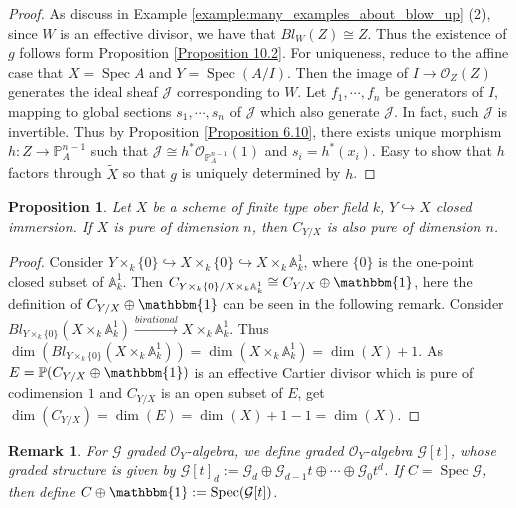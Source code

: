 \documentclass{ctexart}
\newtheorem{remark}{Remark}[section]
\newtheorem{proposition}{Proposition}[section]
\newcommand{\spec}{\operatorname{Spec}}
\begin{document}
\begin{proof}
    As discuss in Example \ref{example:many_examples_about_blow_up} (2), since $W$ is an effective divisor, we have that $Bl_{W}(Z) \cong Z$.
    Thus the existence of $g$ follows form Proposition \ref{Proposition 10.2}.
    For uniqueness, reduce to the affine case that $X = \spec A$ and $Y = \spec(A/I)$.
    Then the image of $I \longrightarrow \mathcal{O}_{Z}(Z)$ generates the ideal sheaf $\mathcal{J}$ corresponding to $W$.
    Let $f_{1}, \cdots, f_{n}$ be generators of $I$, mapping to global sections $s_{1}, \cdots, s_{n}$ of $\mathcal{J}$ which also generate $\mathcal{J}$.
    In fact, such $\mathcal{J}$ is invertible.
    Thus by Proposition \ref{Proposition 6.10}, there exists unique morphism $h: Z \longrightarrow \mathbb{P}_{A}^{n - 1}$ such that $\mathcal{J} \cong h^{\ast}\mathcal{O}_{\mathbb{P}_{A}^{n - 1}}(1)$ and $s_{i} = h^{\ast}(x_{i})$.
    Easy to show that $h$ factors through $\widetilde{X}$ so that $g$ is uniquely determined by $h$.
\end{proof}
\begin{proposition}
    Let $X$ be a scheme of finite type ober field $k$, $Y \hookrightarrow X$ closed immersion.
    If $X$ is pure of dimension $n$, then $C_{Y/X}$ is also pure of dimension $n$.
    \label{Proposition 10.3}
\end{proposition}
\begin{proof}
    Consider $Y \times_{k} \{0\} \hookrightarrow X \times_{k} \{0\} \hookrightarrow X \times_{k} \mathbb{A}_{k}^{1}$,
    where $\{0\}$ is the one-point closed subset of $\mathbb{A}_{k}^{1}$.
    Then $C_{Y \times_{k} \{0\}/X \times_{k} \mathbb{A}_{k}^{1}} \cong C_{Y/X} \oplus \mathbbm{1}$, here the definition of $C_{Y/X} \oplus \mathbbm{1}$ can be seen in the following remark.
    Consider $Bl_{Y \times_{k} \{0\}}(X \times_{k} \mathbb{A}_{k}^{1}) \overset{birational}{\longrightarrow} X \times_{k} \mathbb{A}_{k}^{1}$.
    Thus $\dim(Bl_{Y \times_{k} \{0\}}(X \times_{k} \mathbb{A}_{k}^{1})) = \dim(X \times_{k} \mathbb{A}_{k}^{1}) = \dim(X) + 1$.
    As $E = \mathbb{P}(C_{Y/X} \oplus \mathbbm{1})$ is an effective Cartier divisor which is pure of codimension $1$ and $C_{Y/X}$ is an open subset of $E$,
    get $\dim(C_{Y/X}) = \dim(E) = \dim(X) + 1 - 1 = \dim(X)$.
\end{proof}
\begin{remark}
    For $\mathcal{G}$ graded $\mathcal{O}_{Y}$-algebra, we define graded $\mathcal{O}_{Y}$-algebra $\mathcal{G}[t]$, whose graded structure is given by $\mathcal{G}[t]_{d} := \mathcal{G}_{d} \oplus \mathcal{G}_{d - 1}t \oplus \cdots \oplus \mathcal{G}_{0}t^{d}$.
    If $C = \spec\mathcal{G}$, then define $C \oplus \mathbbm{1} := \spec(\mathcal{G}[t])$.
\end{remark}
\end{document}
